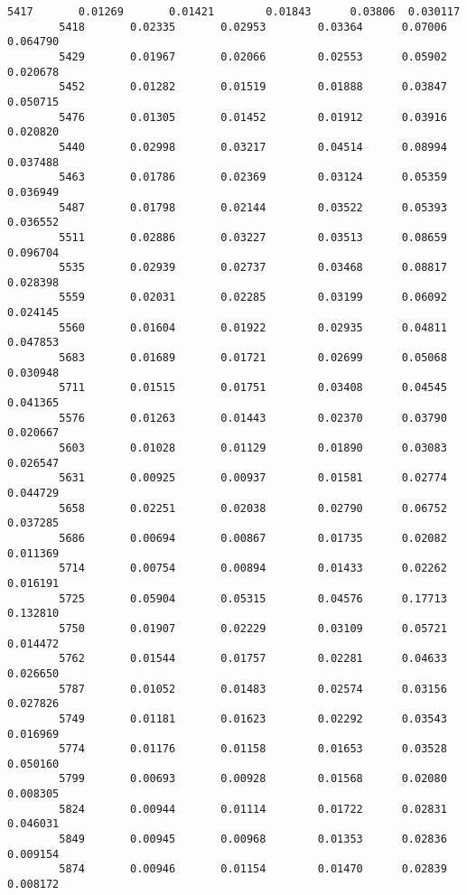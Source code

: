 \documentclass[11pt]{article}
\begin{document}
\begin{Verbatim}[commandchars=\\\{\}]
        5417       0.01269       0.01421        0.01843      0.03806  0.030117   
        5418       0.02335       0.02953        0.03364      0.07006  0.064790   
        5429       0.01967       0.02066        0.02553      0.05902  0.020678   
        5452       0.01282       0.01519        0.01888      0.03847  0.050715   
        5476       0.01305       0.01452        0.01912      0.03916  0.020820   
        5440       0.02998       0.03217        0.04514      0.08994  0.037488   
        5463       0.01786       0.02369        0.03124      0.05359  0.036949   
        5487       0.01798       0.02144        0.03522      0.05393  0.036552   
        5511       0.02886       0.03227        0.03513      0.08659  0.096704   
        5535       0.02939       0.02737        0.03468      0.08817  0.028398   
        5559       0.02031       0.02285        0.03199      0.06092  0.024145   
        5560       0.01604       0.01922        0.02935      0.04811  0.047853   
        5683       0.01689       0.01721        0.02699      0.05068  0.030948   
        5711       0.01515       0.01751        0.03408      0.04545  0.041365   
        5576       0.01263       0.01443        0.02370      0.03790  0.020667   
        5603       0.01028       0.01129        0.01890      0.03083  0.026547   
        5631       0.00925       0.00937        0.01581      0.02774  0.044729   
        5658       0.02251       0.02038        0.02790      0.06752  0.037285   
        5686       0.00694       0.00867        0.01735      0.02082  0.011369   
        5714       0.00754       0.00894        0.01433      0.02262  0.016191   
        5725       0.05904       0.05315        0.04576      0.17713  0.132810   
        5750       0.01907       0.02229        0.03109      0.05721  0.014472   
        5762       0.01544       0.01757        0.02281      0.04633  0.026650   
        5787       0.01052       0.01483        0.02574      0.03156  0.027826   
        5749       0.01181       0.01623        0.02292      0.03543  0.016969   
        5774       0.01176       0.01158        0.01653      0.03528  0.050160   
        5799       0.00693       0.00928        0.01568      0.02080  0.008305   
        5824       0.00944       0.01114        0.01722      0.02831  0.046031   
        5849       0.00945       0.00968        0.01353      0.02836  0.009154   
        5874       0.00946       0.01154        0.01470      0.02839  0.008172   
        

\end{Verbatim}
\end{document}
